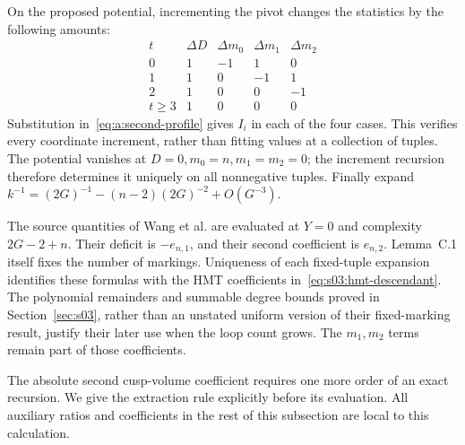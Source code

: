 \begin{prf}
On the proposed potential, incrementing the pivot changes the statistics
by the following amounts:
\[
\begin{array}{c|rrrr}
 t&\Delta D&\Delta m_0&\Delta m_1&\Delta m_2\\\hline
 0&1&-1&1&0\\
 1&1&0&-1&1\\
 2&1&0&0&-1\\
 t\geq3&1&0&0&0
\end{array}
\]
Substitution in~\eqref{eq:a:second-profile} gives $I_i$ in each of
the four cases. This verifies every coordinate increment, rather
than fitting values at a collection of tuples. The potential vanishes
at $D=0,m_0=n,m_1=m_2=0$; the increment recursion therefore determines
it uniquely on all nonnegative tuples. Finally expand
$k^{-1}=(2G)^{-1}-(n-2)(2G)^{-2}+O(G^{-3})$.
\end{prf}

\begin{rmk}[Identification]
The source quantities of Wang et al. are evaluated at $Y=0$ and
complexity $2G-2+n$. Their deficit is $-e_{n,1}$, and their second coefficient
is $e_{n,2}$. Lemma~C.1 itself fixes the number of markings. Uniqueness
of each fixed-tuple expansion identifies these formulas with the HMT
coefficients in~\eqref{eq:s03:hmt-descendant}. The polynomial remainders
and summable degree bounds proved in Section~\ref{sec:s03}, rather than
an unstated uniform version of their fixed-marking result, justify their later use when the
loop count grows. The $m_1,m_2$ terms remain part of those coefficients.
\end{rmk}

The absolute second cusp-volume coefficient requires one more order of
an exact recursion. We give the extraction rule explicitly before its
evaluation. All auxiliary ratios and coefficients in the rest of this
subsection are local to this calculation.

